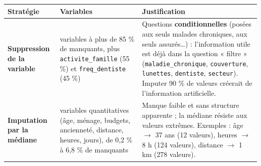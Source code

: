 \documentclass[

  french,

  10pt,

  a4paper,

]{article}
\newcounter{none} %
\begin{document}
{\def\LTcaptype{none} %

\begin{longtable}[]{@{}

  >{\raggedright\arraybackslash}p{}

  >{\raggedright\arraybackslash}p{}

  >{\raggedright\arraybackslash}p{}@{}}

\toprule\noalign{}

\begin{minipage}[b]{\linewidth}\raggedright

Stratégie

\end{minipage} & \begin{minipage}[b]{\linewidth}\raggedright

Variables

\end{minipage} & \begin{minipage}[b]{\linewidth}\raggedright

Justification

\end{minipage} \\

\midrule\noalign{}

\endhead

\bottomrule\noalign{}

\endlastfoot

\textbf{Suppression de la variable} & 9 variables à plus de 85 \% de manquants, plus \texttt{activite\_famille} (55 \%) et \texttt{freq\_dentiste} (45 \%) & Questions \textbf{conditionnelles} (posées aux seuls malades chroniques, aux seuls assurés\ldots) : l'information utile est déjà dans la question « filtre » (\texttt{maladie\_chronique}, \texttt{couverture}, \texttt{lunettes}, \texttt{dentiste}, \texttt{secteur}). Imputer 90 \% de valeurs créerait de l'information artificielle. \\

\textbf{Imputation par la médiane} & 10 variables quantitatives (âge, ménage, budgets, ancienneté, distance, heures, jours), de 0,2 \% à 6,8 \% de manquants & Manque faible et sans structure apparente ; la médiane résiste aux valeurs extrêmes. Exemples : âge \ensuremath{\rightarrow} 37 ans (12 valeurs), heures \ensuremath{\rightarrow} 8 h (124 valeurs), distance \ensuremath{\rightarrow} 1 km (278 valeurs). \\


\end{longtable}}
\end{document}
